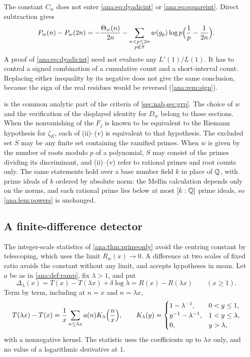 \begin{remark}\label{ana:rem:finite}
The constant $C_w$ does not enter \eqref{ana:eq:dyadicint} or \eqref{ana:eq:squareint}. Direct
subtraction gives
\[
 P_w(n)-P_w(2n)=-\frac{\Theta_w(n)}{2n}
 -\sum_{\substack{n<p\le2n\\p\notin S}}w(g_p)\log p\Bigl(\frac1p-\frac1{2n}\Bigr).
\]
A proof of \eqref{ana:eq:dyadicint} need not evaluate any $L'(1)/L(1)$. It has to control a
signed combination of a cumulative count and a short-interval count. Replacing either
inequality by its negative does not give the same conclusion, because the sign of the real
residues would be reversed (\cref{ana:rem:sign}).
\end{remark}

\begin{remark}[Scope]\label{ana:rem:base}
 is the common analytic part of the criteria of
\cref{sec:nab,sec:grp}. The choice of $w$ and the verification of the displayed identity for
$D_w$ belong to those sections. When the nonvanishing of the $F_j$ is known to be equivalent to
the Riemann hypothesis for $\zeta_E$, each of (ii)--(v) is equivalent to that hypothesis. The
excluded set $S$ may be any finite set containing the ramified primes. When $w$ is given by the
number of roots modulo $p$ of a polynomial, $S$ may consist of the primes dividing its
discriminant, and (ii)--(v) refer to rational primes and root counts only. The same statements
hold over a base number field $k$ in place of $\mathbb{Q}$, with prime ideals of $k$ ordered by absolute
norm: the Mellin calculation depends only on the norms, and each rational prime lies below at
most $[k:\mathbb{Q}]$ prime ideals, so \cref{ana:lem:powers} is unchanged.
\end{remark}

\subsection{A finite-difference detector}\label{ana:sec:fd}
{\raggedright{}}

The integer-scale statistics of \cref{ana:thm:primeonly} avoid the centring constant by
telescoping, which uses the limit $R_w(x)\to0$. A difference at two scales of fixed ratio avoids
the constant without any limit, and accepts hypotheses in mean. Let $a$ be as in
\cref{ana:def:ramp}, fix $\lambda>1$, and put
\begin{equation}\label{ana:eq:fd}
 \Delta_\lambda(x)=T(x)-T(\lambda x)+\delta\log\lambda=R(x)-R(\lambda x)\qquad(x\ge1).
\end{equation}
Term by term, including at $n=x$ and $n=\lambda x$,
\[
 T(\lambda x)-T(x)=\frac1x\sum_{n\le\lambda x}a(n)K_\lambda\Bigl(\frac nx\Bigr),\qquad
 K_\lambda(y)=\begin{cases}1-\lambda^{-1},&0<y\le1,\\ y^{-1}-\lambda^{-1},&1<y\le\lambda,\\
 0,&y>\lambda,\end{cases}
\]
with a nonnegative kernel. The statistic uses the coefficients up to $\lambda x$ only, and no
value of a logarithmic derivative at $1$.

